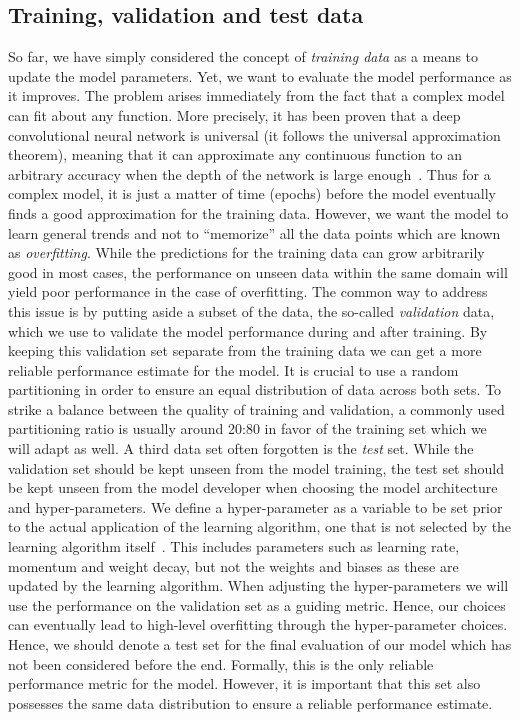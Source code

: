 \subsection{Training, validation and test data}
So far, we have simply considered the concept of \textit{training data} as a
means to update the model parameters. Yet, we want to evaluate the model
performance as it improves. The problem arises immediately from the fact that a
complex model can fit about any function. More precisely, it has been proven
that a deep convolutional neural network is universal (it follows the universal
approximation theorem), meaning that it can approximate any continuous function
to an arbitrary accuracy when the depth of the network is large enough~\cite{cybenko_approximation_1989}. Thus for a complex model, it is just a matter
of time (epochs) before the model eventually finds a good approximation for the
training data. However, we want the model to learn general trends and not to
``memorize'' all the data points which are known as \textit{overfitting}. While
the
predictions for the training data can grow arbitrarily good in most cases, the
performance on unseen data within the same domain will yield poor performance in the
case of overfitting. The common way to address this issue is by putting aside a
subset of the data, the so-called \textit{validation} data, which we use to
validate the model performance during and after training. By keeping this
validation set separate from the training data we can get a more
reliable performance estimate for the model. It is crucial to use a random partitioning in order to ensure an equal distribution of data across both sets. To strike a balance
between the quality of training and validation, a commonly used partitioning
ratio is usually around 20:80 in favor of the training set which we will adapt as well. A third data set often forgotten is the
\textit{test} set. While the validation set should be kept unseen from the model
training, the test set should be kept unseen from the model developer when choosing the model architecture and hyper-parameters. We define a hyper-parameter
as a variable to be set prior to the actual application of the learning
algorithm, one that is not selected by the learning algorithm
itself~\cite{Bengio2012}. This includes parameters such as learning rate,
momentum and weight decay, but not the weights and biases as these are updated
by the learning algorithm. When adjusting the hyper-parameters we will use the
performance on the validation set as a guiding metric. Hence, our choices can
eventually lead to high-level overfitting through the hyper-parameter
choices. Hence, we should denote a test set for the final evaluation of our
model which has not been considered before the end. Formally, this is the only
reliable performance metric for the model. However, it is important that this set also possesses the same data distribution to ensure a reliable performance estimate.


